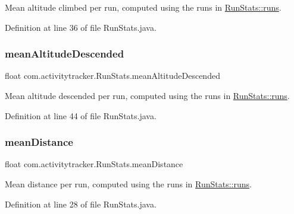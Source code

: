 Mean altitude climbed per run, computed using the runs in \mbox{\hyperlink{classcom_1_1activitytracker_1_1_run_stats_a0fd429e9f463ddf4897c507c0e3c0a12}{Run\+Stats\+::runs}}. 

Definition at line 36 of file Run\+Stats.\+java.

\mbox{\label{classcom_1_1activitytracker_1_1_run_stats_a578eae64367a00c625f4685fe879fe7c}} 
\subsubsection{\texorpdfstring{meanAltitudeDescended}{meanAltitudeDescended}}
{\footnotesize\ttfamily float com.\+activitytracker.\+Run\+Stats.\+mean\+Altitude\+Descended\hspace{0.3cm}{\ttfamily [private]}}

Mean altitude descended per run, computed using the runs in \mbox{\hyperlink{classcom_1_1activitytracker_1_1_run_stats_a0fd429e9f463ddf4897c507c0e3c0a12}{Run\+Stats\+::runs}}. 

Definition at line 44 of file Run\+Stats.\+java.

\mbox{\label{classcom_1_1activitytracker_1_1_run_stats_afcc9ab47852b6df6b15e9a592fe6c5ed}} 
\subsubsection{\texorpdfstring{meanDistance}{meanDistance}}
{\footnotesize\ttfamily float com.\+activitytracker.\+Run\+Stats.\+mean\+Distance\hspace{0.3cm}{\ttfamily [private]}}

Mean distance per run, computed using the runs in \mbox{\hyperlink{classcom_1_1activitytracker_1_1_run_stats_a0fd429e9f463ddf4897c507c0e3c0a12}{Run\+Stats\+::runs}}. 

Definition at line 28 of file Run\+Stats.\+java.

\mbox{\label{classcom_1_1activitytracker_1_1_run_stats_a8bf9f1577cffd26e6235695278bfcdb9}} 
